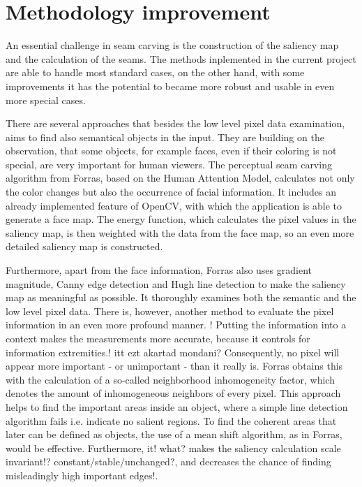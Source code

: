 \documentclass[draft,final]{vutinfth} %
\begin{document}
	\section{Methodology improvement}
	An essential challenge in seam carving is the construction of the saliency map and the calculation of the seams. 
	The methods inplemented in the current project are able to handle most standard cases, on the other hand, with some improvements it has the potential to became more robust and usable in even more special cases.\par 
	There are several approaches that besides the low level pixel data examination, aims to find also semantical objects in the input.
	They are building on the observation, that some objects, for example faces, even if their coloring is not special, are very important for human viewers.
	The perceptual seam carving algorithm from Forras, based on the Human Attention Model, calculates not only the color changes but also the occurrence of facial information.
	It includes an already implemented feature of OpenCV, with which the application is able to generate a face map.
	The energy function, which calculates the pixel values in the saliency map, is then weighted with the data from the face map, so an even more detailed saliency map is constructed.\par 
	Furthermore, apart from the face information, Forras also uses gradient magnitude, Canny edge detection and Hugh line detection to make the saliency map as meaningful as possible. 
	It thoroughly examines both the semantic and the low level pixel data.
	There is, however, another method to evaluate the pixel information in an even more profound manner.
	! Putting the information into a context makes the measurements more accurate, because it controls for information extremities.! itt ezt akartad mondani?
	Consequently, no pixel will appear more important - or unimportant - than it really is.
	Forras obtains this with the calculation of a so-called neighborhood inhomogeneity factor, which denotes the amount of inhomogeneous neighbors of every pixel. 
	This approach helps to find the important areas inside an object, where a simple line detection algorithm fails i.e. indicate no salient regions.
	To find the coherent areas that later can be defined as objects, the use of a mean shift algorithm, as in Forras, would be effective. 
	Furthermore, it! what? makes the saliency calculation scale invariant!? constant/stable/unchanged?, and decreases the chance of finding misleadingly high important edges!.\par 
\end{document}
